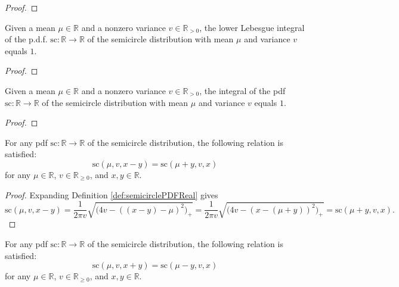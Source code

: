 \begin{proof}
  \leanok
\end{proof}
\begin{lemma}\label{lem:lintegral_semicirclePDFReal_eq_one}
    \leanok
    Given a mean $\mu \in \mathbb{R}$ and a nonzero variance $v \in \mathbb{R}_{> 0}$, the lower Lebesgue integral of the p.d.f. $\mathrm{sc} : \mathbb{R} \rightarrow \mathbb{R}$
    of the semicircle distribution with mean $\mu$ and variance $v$ equals $1$.
\end{lemma}
\begin{proof}
  \leanok
\end{proof}
\begin{lemma}\label{lem:integral_semicirclePDFReal_eq_one}
    \leanok
    Given a mean $\mu \in \mathbb{R}$ and a nonzero variance $v \in \mathbb{R}_{> 0}$, the integral of the pdf $\mathrm{sc} : \mathbb{R} \rightarrow \mathbb{R}$
    of the semicircle distribution with mean $\mu$ and variance $v$ equals $1$.
\end{lemma}
\begin{proof}
  \leanok
\end{proof}
\begin{lemma}\label{lem:semicirclePDFReal_sub}
    \leanok
    For any pdf $\mathrm{sc} : \mathbb{R} \rightarrow \mathbb{R}$
    of the semicircle distribution, the following relation is satisfied:
    \[
    \mathrm{sc}(\mu,v,x-y) = \mathrm{sc}(\mu+y,v,x)
    \]
    for any $\mu \in \mathbb{R}$, $v \in \mathbb{R}_{\geq 0}$, and $x,y \in \mathbb{R}$.
\end{lemma}
\begin{proof}
  \leanok
   Expanding Definition \ref{def:semicirclePDFReal} gives
   \[
   \mathrm{sc}(\mu,v,x-y)
   = \frac{1}{2πv} \sqrt{\bigl( 4v - ( (x - y) - μ)^2 \bigl)_+}
   = \frac{1}{2πv} \sqrt{\bigl( 4v - (x - (μ + y))^2 \bigl)_+}
   = \mathrm{sc}(\mu+y,v,x).
   \]
\end{proof}
\begin{lemma}\label{lem:semicirclePDFReal_add}
    \leanok
    For any pdf $\mathrm{sc} : \mathbb{R} \rightarrow \mathbb{R}$
    of the semicircle distribution, the following relation is satisfied:
    \[
    \mathrm{sc}(\mu,v,x+y) = \mathrm{sc}(\mu-y,v,x)
    \]
    for any $\mu \in \mathbb{R}$, $v \in \mathbb{R}_{\geq 0}$, and $x,y \in \mathbb{R}$.
\end{lemma}
